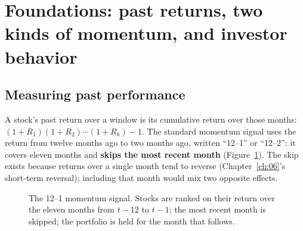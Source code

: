 \section{Foundations: past returns, two kinds of momentum, and investor behavior}
\label{sec:09-foundations}

\subsection{Measuring past performance}

A stock's past return over a window is its cumulative return over those months: $(1 + R_1)(1 + R_2)\cdots(1 + R_k) - 1$. The standard momentum signal uses the return from twelve months ago to two months ago, written ``12--1'' or ``12--2'': it covers eleven months and \textbf{skips the most recent month} (Figure~\ref{fig:09-signal}). The skip exists because returns over a single month tend to reverse (Chapter~\ref{ch:06}'s short-term reversal); including that month would mix two opposite effects.

\begin{figure}[htbp]
\centering
{}
\caption{The 12--1 momentum signal. Stocks are ranked on their return over the eleven months from $t-12$ to $t-1$; the most recent month is skipped; the portfolio is held for the month that follows.}
\label{fig:09-signal}
\end{figure}

